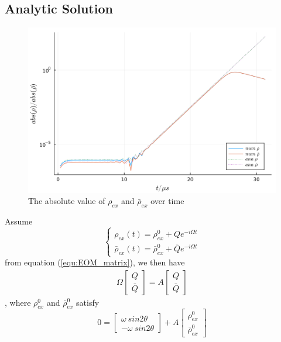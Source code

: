 \documentclass[aps,prd,twocolumn,amsmath,amssymb,groupedaddress]{revtex4-2}
\begin{document}
\subsection{\label{subsec:analytic} Analytic Solution}
\begin{figure}[t]
	\includegraphics[scale=0.28]{compare_rho.png}
	\caption{\label{fig:compare_rho} The absolute value of $\rho_{ex}$ and $\bar{\rho}_{ex}$ over time}
\end{figure}

Assume
\begin{equation}
	\begin{cases}
		\rho_{ex}(t) = \rho^0_{ex} + Q e^{-i\Omega t}
		\\
		\bar{\rho}_{ex}(t) = \bar{\rho}^0_{ex} + \bar{Q} e^{-i\Omega t}
	\end{cases}
\end{equation}
from equation (\ref{equ:EOM_matrix}), we then have
\begin{eqnarray}
	\label{equ:eigenfunction}
	\Omega 
	\begin{bmatrix}
		Q \\ \bar{Q}
	\end{bmatrix}
	= A
	\begin{bmatrix}
		Q \\ \bar{Q}
	\end{bmatrix}
\end{eqnarray}, where $\rho^0_{ex}$ and $\bar{\rho}^0_{ex}$ satisfy
\begin{equation}
	\label{equ:rho0}
	0= \begin{bmatrix}
		\omega ~sin2\theta \\ - \omega ~sin2\theta
	\end{bmatrix}  + 
	A \begin{bmatrix} \rho^0_{ex} \\ \bar{\rho}^0_{ex}
	\end{bmatrix}
\end{equation}
\end{document}
